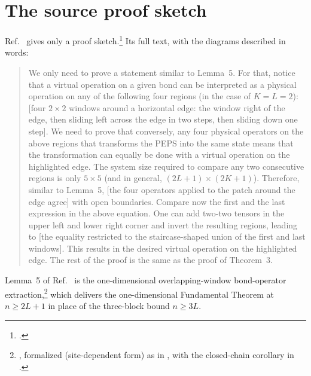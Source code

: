 \documentclass{article}
\begin{document}
\section{The source proof sketch}

Ref.~\cite{Molnar2018NormalPEPS} gives only a proof sketch.\footnote{.}
Its full text, with the diagrams described in words:

\begin{quote}
    We only need to prove a statement similar to Lemma~5. For that, notice
    that a virtual operation on a given bond can be interpreted as a
    physical operation on any of the following four regions (in the case
    of $K=L=2$): [four $2\times2$ windows around a horizontal edge: the
    window right of the edge, then sliding left across the edge in two
    steps, then sliding down one step]. We need to prove that conversely,
    any four physical operators on the above regions that transforms the
    PEPS into the same state means that the transformation can equally be
    done with a virtual operation on the highlighted edge. The system size
    required to compare any two consecutive regions is only $5\times 5$
    (and in general, $(2L+1)\times (2K+1)$). Therefore, similar to
    Lemma~5, [the four operators applied to the patch around the edge
            agree] with open boundaries. Compare now the first and the last
    expression in the above equation. One can add two-two tensors in the
    upper left and lower right corner and invert the resulting regions,
    leading to [the equality restricted to the staircase-shaped union of
            the first and last windows]. This results in the desired virtual
    operation on the highlighted edge. The rest of the proof is the same
    as the proof of Theorem~3.
\end{quote}

Lemma~5 of Ref.~\cite{Molnar2018NormalPEPS} is the one-dimensional
overlapping-window bond-operator extraction,\footnote{,
    formalized (site-dependent form) as
     in
    , with the closed-chain
    corollary 
    in .} which delivers
the one-dimensional Fundamental Theorem at $n \geq 2L+1$ in place of the
three-block bound $n \geq 3L$.
\end{document}
